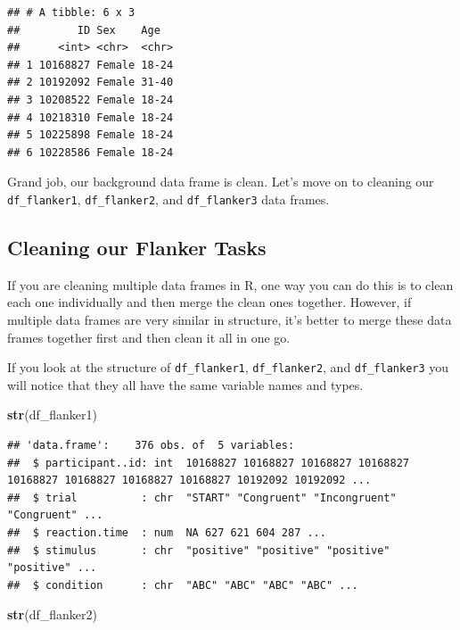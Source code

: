 \documentclass[
]{book}
\newenvironment{Shaded}{\begin{snugshade}}{\end{snugshade}}
\newcommand{\FunctionTok}[1]{\textcolor[rgb]{0.13,0.29,0.53}{\textbf{#1}}}
\newcommand{\NormalTok}[1]{#1}
\begin{document}
\begin{verbatim}
## # A tibble: 6 x 3
##         ID Sex    Age  
##      <int> <chr>  <chr>
## 1 10168827 Female 18-24
## 2 10192092 Female 31-40
## 3 10208522 Female 18-24
## 4 10218310 Female 18-24
## 5 10225898 Female 18-24
## 6 10228586 Female 18-24
\end{verbatim}

Grand job, our background data frame is clean. Let's move on to cleaning our \texttt{df\_flanker1}, \texttt{df\_flanker2}, and \texttt{df\_flanker3} data frames.

\subsection{Cleaning our Flanker Tasks}\label{cleaning-our-flanker-tasks}

If you are cleaning multiple data frames in R, one way you can do this is to clean each one individually and then merge the clean ones together. However, if multiple data frames are very similar in structure, it's better to merge these data frames together first and then clean it all in one go.

If you look at the structure of \texttt{df\_flanker1}, \texttt{df\_flanker2}, and \texttt{df\_flanker3} you will notice that they all have the same variable names and types.

\begin{Shaded}
\begin{Highlighting}[]
\FunctionTok{str}\NormalTok{(df\_flanker1)}
\end{Highlighting}
\end{Shaded}

\begin{verbatim}
## 'data.frame':    376 obs. of  5 variables:
##  $ participant..id: int  10168827 10168827 10168827 10168827 10168827 10168827 10168827 10168827 10192092 10192092 ...
##  $ trial          : chr  "START" "Congruent" "Incongruent" "Congruent" ...
##  $ reaction.time  : num  NA 627 621 604 287 ...
##  $ stimulus       : chr  "positive" "positive" "positive" "positive" ...
##  $ condition      : chr  "ABC" "ABC" "ABC" "ABC" ...
\end{verbatim}

\begin{Shaded}
\begin{Highlighting}[]
\FunctionTok{str}\NormalTok{(df\_flanker2)}
\end{Highlighting}
\end{Shaded}
\end{document}
